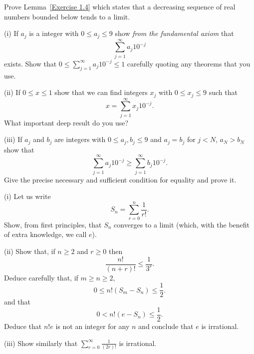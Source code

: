 \begin{question}
Prove
Lemma~\ref{Exercise 1.4} which states that 
a decreasing sequence of real numbers bounded below tends
to a limit.

\end{question}
\begin{question} (i) If $a_{j}$ is a integer 
with $0\leq a_{j}\leq 9$ show \emph{from the fundamental axiom}
that
\[\sum_{j=1}^{\infty}a_{j}10^{-j}\]
exists. Show that $0\leq \sum_{j=1}^{\infty}a_{j}10^{-j}\leq 1$
carefully quoting any theorems that you use.

(ii) If $0\leq x\leq 1$ show that we can find integers
$x_{j}$ with $0\leq x_{j}\leq 9$ such that
\[x=\sum_{j=1}^{\infty}x_{j}10^{-j}.\]
What important deep result do you use?

(iii) If $a_{j}$ and $b_{j}$ are integers 
with $0\leq a_{j},b_{j}\leq 9$ and
$a_{j}=b_{j}$ for $j<N$, $a_{N}>b_{N}$ show that
\[\sum_{j=1}^{\infty}a_{j}10^{-j}\geq \sum_{j=1}^{\infty}b_{j}10^{-j}.\]
Give the precise necessary and sufficient condition
for equality and prove it.

\end{question}
\begin{question} (i) Let us write
\[S_{n}=\sum_{r=0}^{n}\frac{1}{r!}.\]
Show, from first principles, that $S_{n}$ converges
to a limit (which, with the benefit of extra knowledge,
we call $e$).

(ii) Show that, if $n\geq 2$  and $r\geq 0$ then
\[\frac{n!}{(n+r)!}\leq \frac{1}{3^{r}}.\]
Deduce carefully that, if $m\geq n\geq 2$,
\[0\leq n!(S_{m}-S_{n})\leq \frac{1}{2}.\] 
and that
\[0<n!(e-S_{n})\leq \frac{1}{2}.\]
Deduce that $n!e$ is not an integer for any $n$  and
conclude that $e$ is irrational.

(iii) Show similarly that 
${\displaystyle\sum_{r=0}^{\infty}\frac{1}{(2r)!}}$
is irrational.

\end{question}
